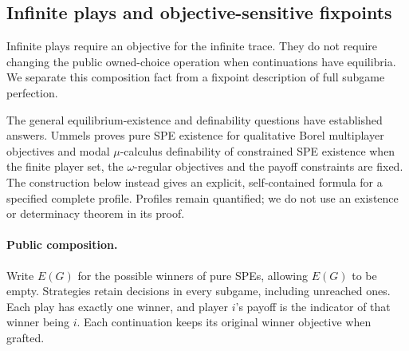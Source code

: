 \subsection{Infinite plays and objective-sensitive fixpoints}\label{app:infinite-plays}

Infinite plays require an objective for the infinite trace. They do not
require changing the public owned-choice operation when continuations
have equilibria. We separate this composition fact from a fixpoint
description of full subgame perfection.

The general equilibrium-existence and definability questions have
established answers. Ummels \cite[Theorems~6 and~13]{Ummels2006} proves
pure SPE existence for qualitative Borel multiplayer objectives and
modal $\mu$-calculus definability of constrained SPE existence when the
finite player set, the $\omega$-regular objectives and the payoff
constraints are fixed. The
construction below instead gives an explicit, self-contained formula
for a specified complete profile. Profiles remain quantified; we do not
use an existence or determinacy theorem in its proof.

\paragraph{Public composition.}
Write $E(G)$ for the possible winners of pure SPEs, allowing $E(G)$ to
be empty. Strategies retain decisions in every subgame, including
unreached ones. Each play has exactly one winner, and player $i$'s
payoff is the indicator of that winner being $i$. Each continuation
keeps its original winner objective when grafted.

